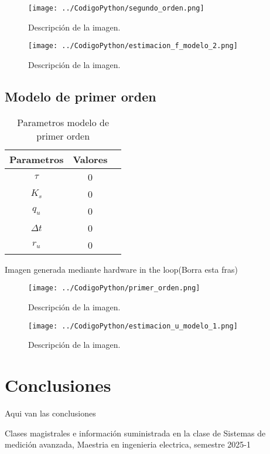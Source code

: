 \documentclass[conference]{IEEEtran}
\begin{document}
\begin{figure}[h]
	\centering
	\texttt{[image: ../CodigoPython/segundo\_orden.png]}
	\caption{Descripción de la imagen.}
	\label{fig:etiqueta}
\end{figure}

\begin{figure}[h]
	\centering
	\texttt{[image: ../CodigoPython/estimacion\_f\_modelo\_2.png]}
	\caption{Descripción de la imagen.}
	\label{fig:etiqueta}
\end{figure}


\subsection{Modelo de primer orden}

\begin{table}[h]
	\centering
	\caption{Parametros modelo de primer orden}
	\label{tab:parametros_primer_orden}
	\begin{tabular}{|c|c|c|}
		\hline
		\textbf{Parametros} & \textbf{Valores} \\
		\hline
		$\tau$  &  0 \\
		$K_s$      & 0 \\
		$q_u$ & 0 \\
		$\Delta t$ & 0\\  
		$r_u$ & 0 \\ 
		\hline
	\end{tabular}
	
\end{table}

Imagen generada mediante hardware in the loop(Borra esta fras)


\begin{figure}[h]
	\centering
	\texttt{[image: ../CodigoPython/primer\_orden.png]}
	\caption{Descripción de la imagen.}
	\label{fig:etiqueta}
\end{figure}

\begin{figure}[h]
	\centering
	\texttt{[image: ../CodigoPython/estimacion\_u\_modelo\_1.png]}
	\caption{Descripción de la imagen.}
	\label{fig:etiqueta}
\end{figure}



\section{Conclusiones}

Aqui van las conclusiones

\begin{thebibliography}{00}

	\item Clases magistrales e información suministrada en la clase de Sistemas de medición avanzada, Maestria en ingenieria electrica, semestre 2025-1

\end{thebibliography}
\end{document}
